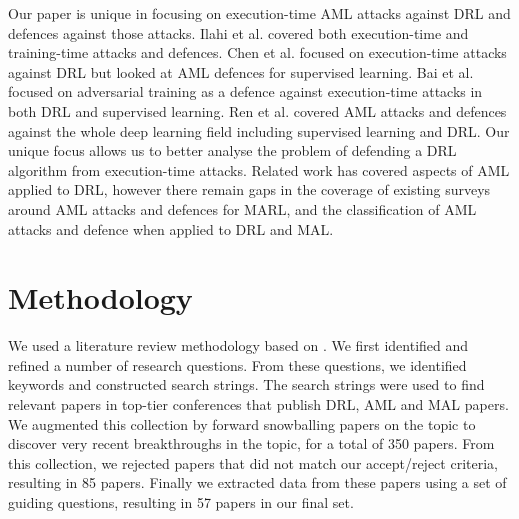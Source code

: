 \documentclass[conference,compsoc]{IEEEtran}
\begin{document}
Our paper is unique in focusing on execution-time AML attacks against DRL and defences against those attacks. Ilahi et al. \cite{ilahi_challenges_2021} covered both execution-time and training-time attacks and defences. Chen et al. \cite{chen_adversarial_2019} focused on execution-time attacks against DRL but looked at AML defences for supervised learning. Bai et al. \cite{bai_recent_2021} focused on adversarial training as a defence against execution-time attacks in both DRL and supervised learning. Ren et al. \cite{ren_adversarial_2020} covered AML attacks and defences against the whole deep learning field including supervised learning and DRL. Our unique focus allows us to better analyse the problem of defending a DRL algorithm from execution-time attacks. Related work has covered aspects of AML applied to DRL, however there remain gaps in the coverage of existing surveys around AML attacks and defences for MARL, and the classification of AML attacks and defence when applied to DRL and MAL. 


\section{Methodology}
We used a literature review methodology based on \cite{kitchenham_systematic_2009}. We first identified and refined a number of research questions. From these questions, we identified keywords and constructed search strings. The search strings were used to find relevant papers in top-tier conferences that publish DRL, AML and MAL papers.  We augmented this collection by forward snowballing \cite{wohlin_guidelines_2014} papers on the topic to discover very recent breakthroughs in the topic, for a total of 350 papers. From this collection, we rejected papers that did not match our accept/reject criteria, resulting in 85 papers. Finally we extracted data from these papers using a set of guiding questions, resulting in 57 papers in our final set. 

\end{document}
